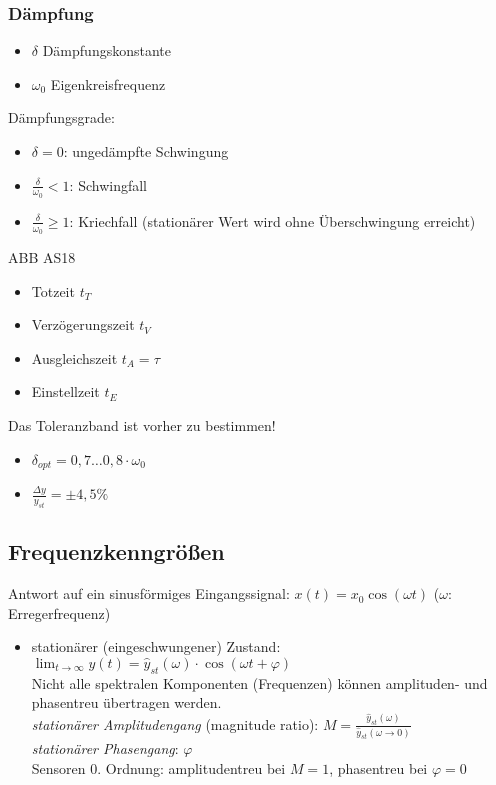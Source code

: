 \subsubsection{Dämpfung}
\begin{itemize}
\item $\delta$ Dämpfungskonstante
\item $\omega_0$ Eigenkreisfrequenz
\end{itemize}
Dämpfungsgrade:
\begin{itemize}
\item $\delta = 0$: ungedämpfte Schwingung%
\item $\frac{\delta}{\omega_0}<1$: Schwingfall
\item $\frac{\delta}{\omega_0}\geq 1$: Kriechfall (stationärer Wert wird ohne Überschwingung erreicht)
\end{itemize}
ABB AS18
\begin{itemize}
\item Totzeit $t_T$
\item Verzögerungszeit $t_V$
\item Ausgleichszeit $t_A = \tau$
\item Einstellzeit $t_E$ 
\end{itemize}
Das Toleranzband ist vorher zu bestimmen!
\begin{itemize}
\item $\delta_{opt}=0,7 \dots 0,8 \cdot \omega_0$
\item $\frac{\Delta y}{y_{st}}=\pm 4,5 \%$
\end{itemize}
\subsection{Frequenzkenngrößen}
Antwort auf ein sinusförmiges Eingangssignal: $x(t) = x_0 \cos (\omega t)$ \quad ($\omega$: Erregerfrequenz)
\begin{itemize}
\item stationärer (eingeschwungener) Zustand: $\lim_{t\to \infty} y(t) = \hat{y}_{st}(\omega) \cdot \cos (\omega t + \varphi)$\\
Nicht alle spektralen Komponenten (Frequenzen) können amplituden- und phasentreu übertragen werden.\\
\emph{stationärer Amplitudengang} (magnitude ratio): $M=\frac{\hat{y}_{st}(\omega)}{\hat{y}_{st} (\omega \to 0)}$\\
\emph{stationärer Phasengang}: $\varphi$\\
Sensoren 0. Ordnung: amplitudentreu bei $M=1$, phasentreu bei $\varphi = 0$
\end{itemize}
